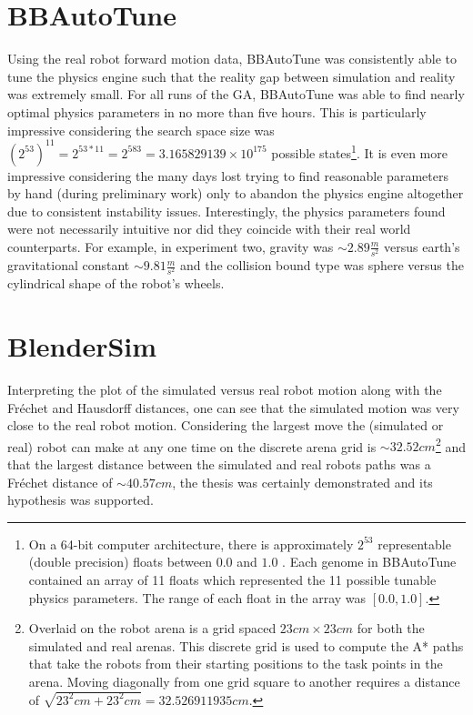 \section{BBAutoTune}

Using the real robot forward motion data, BBAutoTune was consistently able to tune the physics engine such that the reality gap between simulation and reality was extremely small. For all runs of the GA, BBAutoTune was able to find nearly optimal physics parameters in no more than five hours. This is particularly impressive considering the search space size was $(2^{53})^{11}=2^{53*11}=2^{583}=3.165829139\times10^{175}$ possible states\footnote{On a 64-bit computer architecture, there is approximately $2^{53}$ representable (double precision) floats between $0.0$ and $1.0$ \cite{Patterson:2013:COD:2568134}\cite{PythonFloat}. Each genome in BBAutoTune contained an array of 11 floats which represented the 11 possible tunable physics parameters. The range of each float in the array was $[0.0,1.0]$.}. It is even more impressive considering the many days lost trying to find reasonable parameters by hand (during preliminary work) only to abandon the physics engine altogether due to consistent instability issues. Interestingly, the physics parameters found were not necessarily intuitive nor did they coincide with their real world counterparts. For example, in experiment two, gravity was $\sim2.89\frac{m}{s^2}$ versus earth's gravitational constant $\sim9.81\frac{m}{s^2}$ and the collision bound type was sphere versus the cylindrical shape of the robot's wheels.   

\section{BlenderSim}

Interpreting the plot of the simulated versus real robot motion along with the Fr{\'e}chet and Hausdorff distances, one can see that the simulated motion was very close to the real robot motion. Considering the largest move the (simulated or real) robot can make at any one time on the discrete arena grid is $\sim32.52cm$\footnote{Overlaid on the robot arena is a grid spaced $23cm\times23cm$ for both the simulated and real arenas. This discrete grid is used to compute the A* paths that take the robots from their starting positions to the task points in the arena. Moving diagonally from one grid square to another requires a distance of $\sqrt{23^2cm+23^2cm}=32.526911935cm$.} and that the largest distance between the simulated and real robots paths was a Fr{\'e}chet distance of $\sim40.57cm$, the thesis was certainly demonstrated and its hypothesis was supported.  
